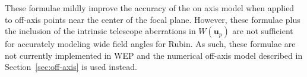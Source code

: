 \documentclass[TS,authoryear,toc]{lsstdoc}
\begin{document}
These formulae mildly improve the accuracy of the on axis model when applied to off-axis points near the center of the focal plane.
However, these formulae plus the inclusion of the intrinsic telescope aberrations in $W(\mathbf{u}_p)$ are not sufficient for accurately modeling wide field angles for Rubin.
As such, these formulae are not currently implemented in WEP and the numerical off-axis model described in Section~\ref{sec:off-axis} is used instead.
\end{document}

